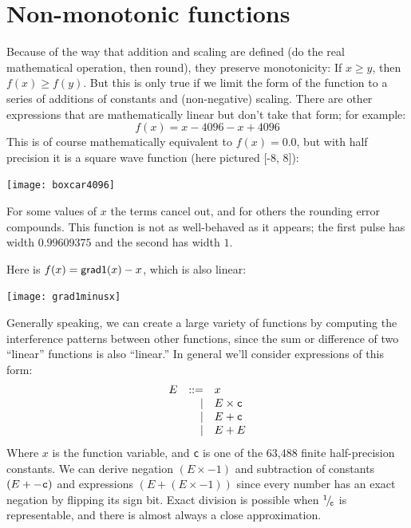 \documentclass[twocolumn]{article}
\newcommand\sfrac[2]{\!{}\,^{#1}\!/{}\!_{#2}}
\begin{document}
\section{Non-monotonic functions}
Because of the way that addition and scaling are defined (do the real
mathematical operation, then round), they preserve monotonicity: If $x
\geq y$, then $f(x) \geq f(y)$. But this is only true if we limit the
form of the function to a series of additions of constants and
(non-negative) scaling. There are other expressions that are
mathematically linear but don't take that form; for example:
%
$$f(x) = x - 4096 - x + 4096$$
%
This is of course mathematically equivalent to $f(x) = 0.0$, but with
half precision it is a square wave function (here pictured [-8, 8]):
%
\begin{center}
\texttt{[image: boxcar4096]}
\end{center}

For some values of $x$ the terms cancel out, and for others the
rounding error compounds. This function is not as well-behaved
as it appears; the first pulse has width $0.99609375$ and
the second has width $1$.

Here is $f(x) = {\sf grad1}(x) - x$, which is also linear:
%
\begin{center}
\texttt{[image: grad1minusx]}
\end{center}

Generally speaking, we can create a large variety of functions by
computing the interference patterns between other functions, since the
sum or difference of two ``linear'' functions is also ``linear.'' In
general we'll consider expressions of this form:
%
\[
\begin{array}{rrl}
E & ::= & x              \\
  &  |  & E \times {\tt c}    \\
  &  |  & E + {\tt c}    \\
  &  |  & E + E          \\
\end{array}
\]
%
Where $x$ is the function variable, and {\tt c} is one of the 63,488
finite half-precision constants. We can derive negation $(E \times -1)$ and
subtraction of constants $(E + -{\tt c})$ and expressions $(E + (E \times
-1))$ since every number has an exact negation by flipping its sign
bit. Exact division is possible when $\sfrac{1}{{\tt c}}$ is
representable, and there is almost always a close approximation.
\end{document}
